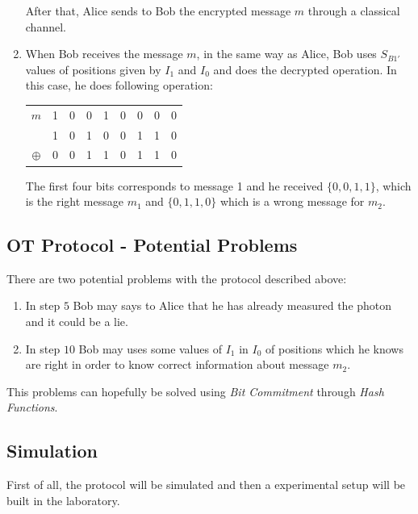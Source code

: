 \begin{enumerate}
   After that, Alice sends to Bob the encrypted message $m$ through a classical channel.

  \item When Bob receives the message $m$, in the same way as Alice, Bob uses $S_{B1\prime}$ values of positions given by $I_{1}$ and $I_{0}$ and does the decrypted operation. In this case, he does following operation:

      \begin{table}[H]
        \centering
        \begin{tabular}{c|c c c c c c c c}
         $m$ & 1 & 0 & 0 & 1 & 0 & 0 & 0 & 0 \\
             & 1 & 0 & 1 & 0 & 0 & 1 & 1 & 0 \\ \hline
         $\oplus$ & 0 & 0 & 1 & 1 & 0 & 1 & 1 & 0 \\
        \end{tabular}
        \end{table}

      The first four bits corresponds to message 1 and he received $\{0,0,1,1\}$, which is the right message $m_{1}$ and $\{0,1,1,0\}$ which is a wrong message for $m_{2}$.


\end{enumerate}

\subsection{OT Protocol - Potential Problems}
There are two potential problems with the protocol described above:
\begin{enumerate}
  \item In step $5$ Bob may says to Alice that he has already measured the photon and it could be a lie.

  \item In step $10$ Bob may uses some values of $I_{1}$ in $I_{0}$ of positions which he knows are right in order to know correct information about message $m_{2}$.
\end{enumerate}

This problems can hopefully be solved using \textit{Bit Commitment} through \textit{Hash Functions}.

\subsection{Simulation}

First of all, the protocol will be simulated and then a experimental setup will be built in the laboratory.

